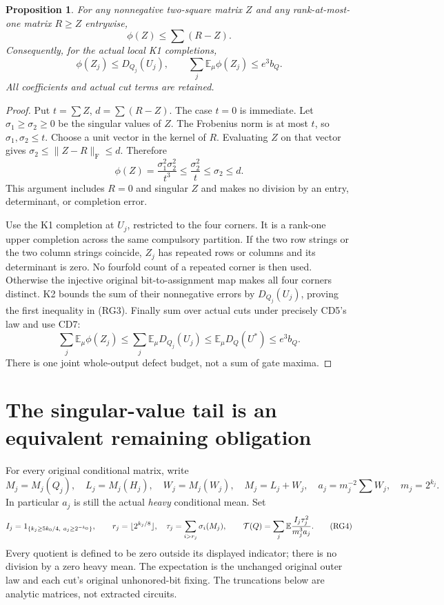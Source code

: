 \documentclass[11pt]{article}
\newtheorem{proposition}{Proposition}
\newcommand{\E}{\mathbb E}
\begin{document}
\begin{proposition}
For any nonnegative two-square matrix $Z$ and any rank-at-most-one
matrix $R\ge Z$ entrywise,
\[
                    \phi(Z)\le\sum(R-Z).                       \tag{RG2}
\]
Consequently, for the actual local K1 completions,
\[
 \phi(Z_j)\le D_{Q_j}(U_j),\qquad
 \sum_j\E_\mu\phi(Z_j)\le e^3 b_Q.                              \tag{RG3}
\]
All coefficients and actual cut terms are retained.
\end{proposition}
\begin{proof}
Put $t=\sum Z$, $d=\sum(R-Z)$. The case $t=0$ is immediate.
Let $\sigma_1\ge\sigma_2\ge0$ be the singular values of $Z$.
The Frobenius norm is at most $t$, so $\sigma_1,\sigma_2\le t$.
Choose a unit vector in the kernel of $R$. Evaluating $Z$ on
that vector gives
$\sigma_2\le\|Z-R\|_{\mathrm F}\le d$.
Therefore
\[
 \phi(Z)=\frac{\sigma_1^2\sigma_2^2}{t^3}
       \le\frac{\sigma_2^2}{t}\le\sigma_2\le d.
\]
This argument includes $R=0$ and singular $Z$ and makes no division
by an entry, determinant, or completion error.

Use the K1 completion at $U_j$, restricted to the four corners.
It is a rank-one upper completion across the same compulsory partition.
If the two row strings or the two column strings coincide, $Z_j$ has
repeated rows or columns and its determinant is zero. No fourfold count
of a repeated corner is then used. Otherwise the injective original
bit-to-assignment map makes all four corners distinct. K2 bounds the
sum of their nonnegative errors by $D_{Q_j}(U_j)$, proving the first
inequality in (RG3). Finally sum over actual cuts under precisely
CD5's law and use CD7:
\[
 \sum_j\E_\mu\phi(Z_j)
 \le\sum_j\E_\mu D_{Q_j}(U_j)
 \le\E_\mu D_Q(U^*)\le e^3b_Q.
\]
There is one joint whole-output defect budget, not a sum of gate maxima.
\end{proof}

\section{The singular-value tail is an equivalent remaining obligation}
For every original conditional matrix, write
\[
 M_j=M_j(Q_j),\quad L_j=M_j(H_j),\quad W_j=M_j(W_j),\quad
 M_j=L_j+W_j,\quad a_j=m_j^{-2}\sum W_j,\quad m_j=2^{k_j}.
\]
In particular $a_j$ is still the actual \emph{heavy} conditional mean.
Set
\[
 I_j=1_{\{k_j\ge5k_0/4,\ a_j\ge2^{-k_0}\}},\qquad
 r_j=\lfloor2^{k_j/8}\rfloor,\quad
 \tau_j=\sum_{i>r_j}\sigma_i(M_j),\qquad
 {\cal T}(Q)=\sum_j\E\frac{I_j\tau_j^2}{m_j^3a_j}.              \tag{RG4}
\]
Every quotient is defined to be zero outside its displayed indicator;
there is no division by a zero heavy mean. The expectation is the
unchanged original outer law and each cut's original unhonored-bit fixing.
The truncations below are analytic matrices, not extracted circuits.
\end{document}
